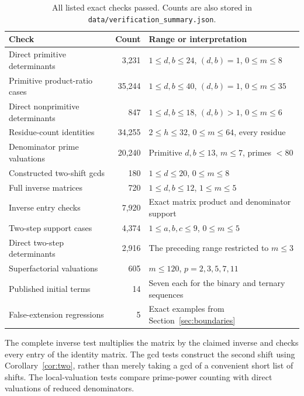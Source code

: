 \documentclass[11pt,a4paper]{article}
\theoremstyle{definition}
\theoremstyle{remark}
\begin{document}
\begin{table}[htbp]
\centering
\small
\begin{tabular}{@{}p{.42\linewidth}r p{.40\linewidth}@{}}
\toprule
Check & Count & Range or interpretation\\
\midrule
Direct primitive determinants & 3,231 & $1\le d,b\le24$, $(d,b)=1$, $0\le m\le8$\\
Primitive product-ratio cases & 35,244 & $1\le d,b\le40$, $(d,b)=1$, $0\le m\le35$\\
Direct nonprimitive determinants & 847 & $1\le d,b\le18$, $(d,b)>1$, $0\le m\le6$\\
Residue-count identities & 34,255 & $2\le h\le32$, $0\le m\le64$, every residue\\
Denominator prime valuations & 20,240 & Primitive $d,b\le13$, $m\le7$, primes $<80$\\
Constructed two-shift gcds & 180 & $1\le d\le20$, $0\le m\le8$\\
Full inverse matrices & 720 & $1\le d,b\le12$, $1\le m\le5$\\
Inverse entry checks & 7,920 & Exact matrix product and denominator support\\
Two-step support cases & 4,374 & $1\le a,b,c\le9$, $0\le m\le5$\\
Direct two-step determinants & 2,916 & The preceding range restricted to $m\le3$\\
Superfactorial valuations & 605 & $m\le120$, $p=2,3,5,7,11$\\
Published initial terms & 14 & Seven each for the binary and ternary sequences\\
False-extension regressions & 5 & Exact examples from Section~\ref{sec:boundaries}\\
\bottomrule
\end{tabular}
\caption{All listed exact checks passed. Counts are also stored in
\texttt{data/verification\_summary.json}.}
\label{tab:checks}
\end{table}

The complete inverse test multiplies the matrix by the claimed inverse and
checks every entry of the identity matrix. The gcd tests construct the
second shift using Corollary~\ref{cor:two}, rather than merely taking a gcd
of a convenient short list of shifts. The local-valuation tests compare
prime-power counting with direct valuations of reduced denominators.
\end{document}
